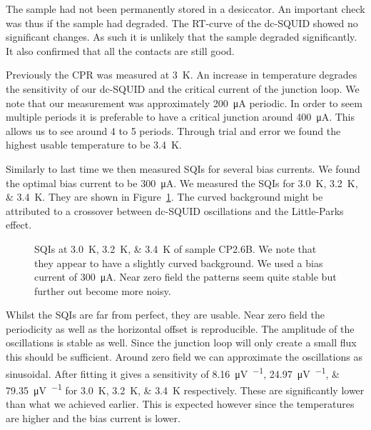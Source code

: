 The sample had not been permanently stored in a desiccator. An important check was thus if the sample had degraded. The RT-curve of the dc-SQUID showed no significant changes. As such it is unlikely that the sample degraded significantly. It also confirmed that all the contacts are still good.

Previously the CPR was measured at \qty{3}{\kelvin}. An increase in temperature degrades the sensitivity of our dc-SQUID and the critical current of the junction loop. We note that our measurement was approximately \qty{200}{\micro\ampere} periodic. In order to seem multiple periods it is preferable to have a critical junction around \qty{400}{\micro\ampere}. This allows us to see around 4 to 5 periods. Through trial and error we found the highest usable temperature to be \qty{3.4}{\kelvin}.

Similarly to last time we then measured SQIs for several bias currents. We found the optimal bias current to be \qty{300}{\micro\ampere}. We measured the SQIs for \qtylist{3.0;3.2;3.4}{\kelvin}. They are shown in Figure~\ref{fig:CP2.6B_revisited_SQIs}. The curved background might be attributed to a crossover between dc-SQUID oscillations and the Little-Parks effect\cite{sharonCurrentinducedSQUIDBehavior2016}.

\begin{figure}[ht!]
	\centering
	
	\caption{SQIs at \qtylist{3.0;3.2;3.4}{\kelvin} of sample CP2.6B. We note that they appear to have a slightly curved background. We used a bias current of \qty{300}{\micro\ampere}. Near zero field the patterns seem quite stable but further out become more noisy.}
	\label{fig:CP2.6B_revisited_SQIs}
\end{figure}

Whilst the SQIs are far from perfect, they are usable. Near zero field the periodicity as well as the horizontal offset is reproducible. The amplitude of the oscillations is stable as well. Since the junction loop will only create a small flux this should be sufficient. Around zero field we can approximate the oscillations as sinusoidal. After fitting it gives a sensitivity of \qtylist{8.16;24.97;79.35}{\micro\volt\per\fluxquantum} for \qtylist{3.0;3.2;3.4}{\kelvin} respectively. These are significantly lower than what we achieved earlier. This is expected however since the temperatures are higher and the bias current is lower.
